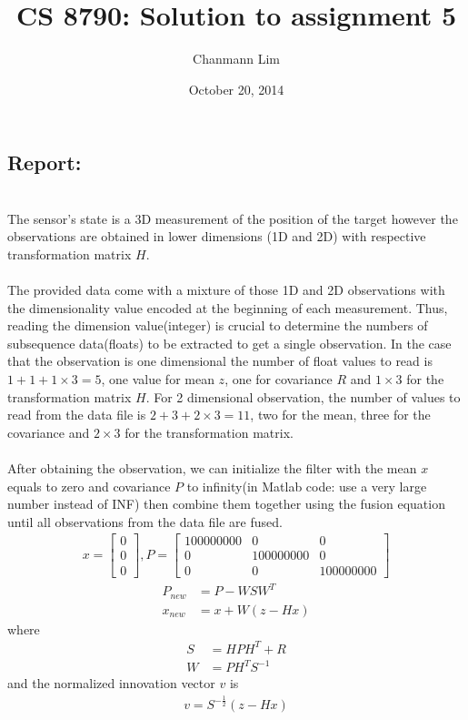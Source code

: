 \documentclass[a4paper]{article}
\begin{document}
\title{CS 8790: Solution to assignment 5}
\author{Chanmann Lim}
\date{October 20, 2014}
\maketitle

\subsection*{Report:} ~\\
\indent The sensor's state is a 3D measurement of the position of the target however the observations are obtained in lower dimensions (1D and 2D) with respective transformation matrix $H$. \\
\\
\indent The provided data come with a mixture of those 1D and 2D observations with the dimensionality value encoded at the beginning of each measurement. Thus, reading the dimension value(integer) is crucial to determine the numbers of subsequence data(floats) to be extracted to get a single observation. In the case that the observation is one dimensional the number of float values to read is $1+1+1\times3=5$, one value for mean $z$, one for covariance $R$ and $1\times3$ for the transformation matrix $H$. For 2 dimensional observation, the number of values to read from the data file is $2+3+2\times3=11$, two for the mean, three for the covariance and $2\times3$ for the transformation matrix.\\
\\
\indent After obtaining the observation, we can initialize the filter with the mean $x$ equals to zero and covariance $P$ to infinity(in Matlab code: use a very large number instead of INF) then combine them together using the fusion equation until all observations from the data file are fused.\\
\begin{align*}
x = \begin{bmatrix}
		0   \\  0   \\   0
	\end{bmatrix}, 
P = \begin{bmatrix}
		100000000   &  0   &   0 \\
		0   &  100000000   &   0 \\
		0   &  0   &   100000000
	\end{bmatrix}
\end{align*}
\begin{align*}
P_{new} &= P - WSW^{T}\\
x_{new} &= x + W(z - Hx)
\end{align*}
where
\begin{align*}
S &= HPH^{T} + R\\
W &= PH^{T}S^{-1}
\end{align*}
and the normalized innovation vector $v$ is
\begin{align*}
v = S^{-\frac{1}{2}}(z-Hx)
\end{align*}
\end{document}
